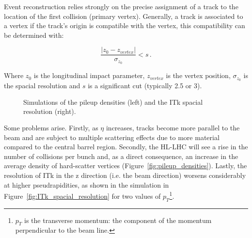 Event reconstruction relies strongly on the precise assignment of a track to the location of the first collision (primary vertex). %
Generally, a track is associated to a vertex if the track's origin is compatible with the vertex, this compatibility can be determined with:

\begin{equation}\label{eq:compatibility_vertex}
    \frac{\left|z_0 - z_{vertex}\right|}{\sigma_{z_0}} < s \,.
\end{equation}
 
Where $z_0$ is the longitudinal impact parameter, $z_{vertex}$ is the vertex position, $\sigma_{z_0}$ is the spacial resolution and $s$ is a significant cut (typically 2.5 or 3)\cite{cernTechnicalDesign}. 

\begin{figure}[!ht]
    \centering
    \hfill
    \centering
    \caption{Simulations of the pileup densities (left) and the ITk spacial resolution (right).}
\end{figure}

Some problems arise. 
Firstly, as $\eta$ increases, tracks become more parallel to the beam and are subject to multiple scattering effects due to more material compared to the central barrel region. Secondly, the HL-LHC will see a rise in the number of collisions per bunch %
 and, as a direct consequence, an increase in the average density of hard-scatter vertices (Figure~\ref{fig:pileup_densities}). Lastly, the resolution of ITk in the z direction (i.e. the beam direction) worsens considerably at higher pseudrapidities, as shown in the simulation in Figure~\ref{fig:ITk_spacial_resolution} for two values of $p_T$\footnote{$p_T$ is the transverse momentum: the component of the momentum perpendicular to the beam line.}.


